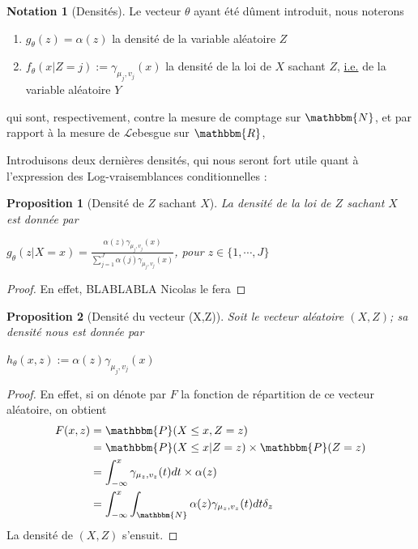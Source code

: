 \documentclass[frenchb]{report}
\newcommand{\R}{\mathbbm{R}}
\newcommand{\N}{\mathbbm{N}}
\newcommand{\1}{\mathbbm{1}}
\newcommand{\prob}{\mathbbm{P}}
\newtheorem{prop}{Proposition}
\theoremstyle{definition}\newtheorem{defn}{Définition}
\theoremstyle{definition}\newtheorem{exm}{Exemple}
\theoremstyle{definition}\newtheorem{nota}{Notation}
\theoremstyle{definition}\newtheorem{rem}{Remarque}
\begin{document}
\begin{nota}[Densités]
Le vecteur $\theta$ ayant été dûment introduit, nous noterons
\begin{enumerate}
	\item $g_\theta(z) = \alpha(z)$ la densité de la variable aléatoire $Z$
	\item $f_\theta(x | Z=j) := \gamma_{\mu_j, v_j}(x)$  la densité de la loi de $X$ sachant $Z$, \underline{i.e.} de la variable aléatoire $Y$
\end{enumerate}
qui sont, respectivement, contre la mesure de comptage sur $\N$, et par rapport à la mesure de $\mathcal{L}$ebesgue sur $\R$,
\end{nota}

Introduisons deux dernières densités, qui nous seront fort utile quant à l'expression des Log-vraisemblances conditionnelles :

\begin{prop}[Densité de $Z$ sachant $X$] La densité de la loi de $Z$ sachant $X$ est donnée par
\begin{center}
$g_\theta(z | X=x ) = \frac{\displaystyle\alpha(z)\gamma_{\mu_j, v_j}(x)}{\displaystyle\sum_{j=1}^J\alpha(j)\gamma_{\mu_j, v_j}(x)}$, pour $z\in \{1,\cdots,J\}$
\end{center}
\end{prop}

\begin{proof}
En effet, BLABLABLA Nicolas le fera
\end{proof}

\begin{prop}[Densité du vecteur (X,Z)]
Soit le vecteur aléatoire $(X, Z)$; sa densité nous est donnée par
\begin{center} $h_\theta(x,z) := \alpha(z)\gamma_{\mu_j, v_j}(x)$ \end{center}
\end{prop}

\begin{proof}
En effet, si on dénote par $F$ la fonction de répartition de ce vecteur aléatoire, on obtient
\begin{align*}
F(x, z) &= \prob(X \leq x, Z = z)\\
&= \prob(X\leq x | Z = z)\times\prob(Z=z)\\
&= \int_{-\infty}^x \gamma_{\mu_z,v_z}(t)dt \times \alpha(z)\\
&= \int_{-\infty}^x \int_\N\alpha(z)\gamma_{\mu_z,v_z}(t)dt\delta_z
\end{align*}
La densité de $(X,Z)$ s'ensuit.
\end{proof}
\end{document}
